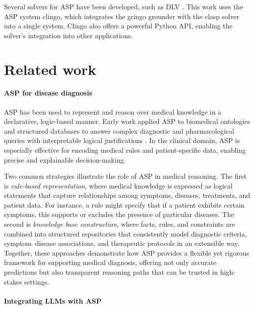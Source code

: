 \documentclass[11pt,leqno]{amsart}
\begin{document}
Several solvers for ASP have been developed, such as DLV \cite{Xia2020}. 
This work uses the ASP system clingo, 
which integrates the gringo grounder \cite{Gebser2014} with the clasp solver \cite{Holldobler2014} into a single system. 
Clingo also offers a powerful Python API, enabling the solver's integration into other applications.

\section{Related work}
\paragraph{\textbf{ASP for disease diagnosis}}
ASP has been used to represent and reason over medical knowledge in a declarative, logic-based manner. 
Early work applied ASP to biomedical ontologies and structured databases to answer complex diagnostic 
and pharmacological queries with interpretable logical justifications \cite{Erdem2011}. 
In the clinical domain, ASP is especially effective for encoding medical rules and patient-specific data, 
enabling precise and explainable decision-making.

Two common strategies illustrate the role of ASP in medical reasoning. 
The first is \textit{rule-based representation}, where medical knowledge is expressed as logical statements 
that capture relationships among symptoms, diseases, treatments, and patient data. 
For instance, a rule might specify that if a patient exhibits certain symptoms, 
this supports or excludes the presence of particular diseases. 
The second is \textit{knowledge base construction}, where facts, rules, and constraints 
are combined into structured repositories that consistently model diagnostic criteria, 
symptom–disease associations, and therapeutic protocols in an extensible way. 
Together, these approaches demonstrate how ASP provides a flexible yet rigorous framework 
for supporting medical diagnosis, offering not only accurate predictions 
but also transparent reasoning paths that can be trusted in high-stakes settings.\\

\paragraph{\textbf{Integrating LLMs with ASP}}
\end{document}
